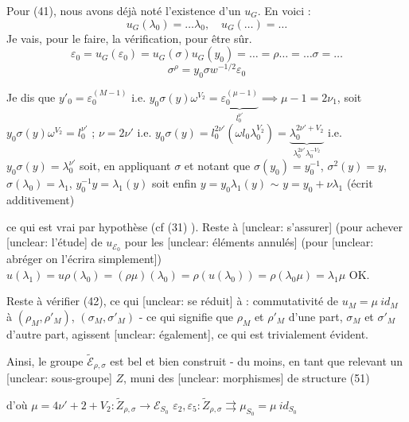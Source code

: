 Pour (41), nous avons déjà noté l'existence d'un $u_G$. En voici :
$$
u_G(\lambda_0) = \dots \lambda_0, \quad u_G(\dots) = \dots
$$
Je vais, pour le faire, la vérification, pour être sûr.
$$
\varepsilon_0 = u_G(\varepsilon_0) = u_G(\sigma) u_G(y_0) = \dots = \rho \dots = \dots \sigma = \dots
$$
$$
\sigma^\rho = y_0 \sigma w^{-1/2} \varepsilon_0
$$

\newpage


Je dis que
$y'_0 = \varepsilon_0^{(M-1)}$ i.e. $y_0 \sigma(y) \omega^{V_2} = \underbrace{\varepsilon_0^{(\mu-1)}}_{l_0^{\nu'}} \implies \mu-1=2\nu_1$, soit
$y_0 \sigma(y) \omega^{V_2} = l_0^{\nu'}$ ; $\nu = 2\nu'$ i.e.
$y_0 \sigma(y) = l_0^{2\nu'} (\omega l_0 \lambda_0^{V_2}) = \underbrace{\lambda_0^{2\nu'+V_2}}_{\lambda_0^{2\nu'} \lambda_0^{-V_2}}$ i.e.
$y_0 \sigma(y) = \lambda_0^{\nu'}$ soit, en appliquant $\sigma$ et notant
que $\sigma(y_0) = y_0^{-1}$, $\sigma^2(y)=y$, $\sigma(\lambda_0)=\lambda_1$,
$y_0^{-1} y = \lambda_1(y)$ soit enfin $y = y_0 \lambda_1(y)$ $\sim$
$y = y_0 + \nu \lambda_1$ (écrit additivement)

ce qui est vrai par hypothèse (cf (31) ).
Reste à [unclear: s'assurer] (pour achever [unclear: l'étude] de $u_{\mathcal{E}_0}$ pour
les [unclear: éléments annulés] (pour [unclear: abréger on l'écrira simplement])
$u(\lambda_1) = u\rho(\lambda_0) = (\rho \mu)(\lambda_0) = \rho(u(\lambda_0)) = \rho(\lambda_0 \mu) = \lambda_1 \mu$
OK.

Reste à vérifier (42), ce qui [unclear: se réduit] à :
commutativité de $u_M = \mu\ id_M$ à
$(\rho_M, \rho'_M)$, $(\sigma_M, \sigma'_M)$ - ce qui signifie que
$\rho_M$ et $\rho'_M$ d'une part, $\sigma_M$ et $\sigma'_M$ d'autre part,
agissent [unclear: également], ce qui est trivialement évident.

Ainsi, le groupe $\tilde{\mathcal{E}}_{\rho, \sigma}$ est bel et
bien construit - du moins, en tant que
relevant un [unclear: sous-groupe] $Z$, muni des [unclear: morphismes]
de structure
(51)
d'où $\mu = 4\nu' + 2 + V_2 : \tilde{Z}_{\rho, \sigma} \to \mathcal{E}_{S_0}$
$\varepsilon_2, \varepsilon_5 : \tilde{Z}_{\rho, \sigma} \rightrightarrows \mu_{S_0} = \mu\ id_{S_0}$

\newpage


